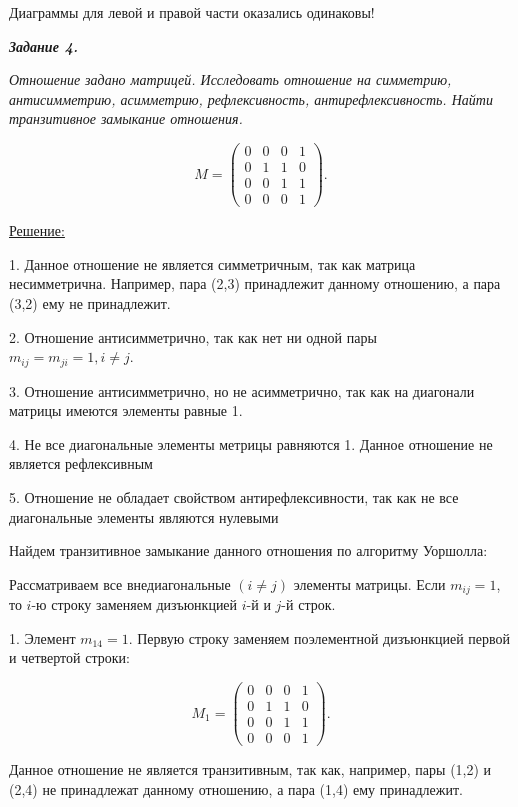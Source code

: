 \documentclass[11pt]{article}
\begin{document}
Диаграммы для левой и правой части оказались одинаковы!

\pagebreak

\textit{\textbf{Задание 4.}}

\textit{Отношение задано матрицей. Исследовать отношение на симметрию,
антисимметрию, асимметрию, рефлексивность, антирефлексивность. Найти
транзитивное замыкание отношения.}

$$M=
\begin{pmatrix}
	0 & 0 & 0 & 1\\
	0 & 1 & 1 & 0\\
	0 & 0 & 1 & 1\\
	0 & 0 & 0 & 1
\end{pmatrix}.$$

\underline{Решение:}

1. Данное отношение не является симметричным, так как матрица
несимметрична. Например, пара (2,3) принадлежит данному отношению, а пара
(3,2) ему не принадлежит.

2. Отношение антисимметрично, так как нет ни одной пары\\
$m_{ij} = m_{ji} = 1, i \neq j$.

3. Отношение антисимметрично, но не асимметрично, так как на
диагонали матрицы имеются элементы равные 1.

4. Не все диагональные элементы метрицы равняются 1.
Данное отношение не является рефлексивным

5. Отношение не обладает свойством антирефлексивности, так как
не все диагональные элементы являются нулевыми

Найдем транзитивное замыкание данного отношения по алгоритму
Уоршолла:

Рассматриваем все внедиагональные $(i \neq j)$ элементы матрицы.
Если $m_{ij}=1$, то $i$-ю строку заменяем дизъюнкцией $i$-й и $j$-й строк.

1. Элемент $m_{14}=1$. Первую строку заменяем поэлементной
дизъюнкцией первой и четвертой строки:

$$M_1=
\begin{pmatrix}
	0 & 0 & 0 & 1\\
	0 & 1 & 1 & 0\\
	0 & 0 & 1 & 1\\
	0 & 0 & 0 & 1
\end{pmatrix}.$$

Данное отношение не является транзитивным, так как, например, пары
(1,2) и (2,4) не принадлежат данному отношению, а пара (1,4)
ему принадлежит.
\end{document}
